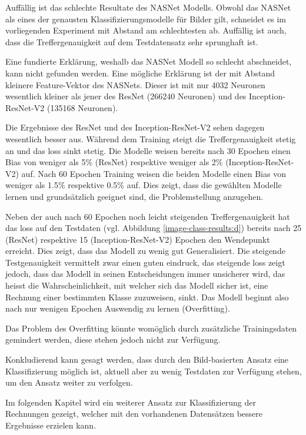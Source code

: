 Auffällig ist das schlechte Resultate des NASNet Modells. Obwohl das NASNet als eines der genausten Klassifizierungsmodelle für Bilder gilt, schneidet es im vorliegenden Experiment mit Abstand am schlechtesten ab. Auffällig ist auch, dass die Treffergenauigkeit auf dem Testdatensatz sehr sprunghaft ist.

Eine fundierte Erklärung, weshalb das NASNet Modell so schlecht abschneidet, kann nicht gefunden werden. Eine mögliche Erklärung ist der mit Abstand kleinere Feature-Vektor des NASNets. Dieser ist mit nur 4032 Neuronen wesentlich kleiner als jener des ResNet (266240 Neuronen) und des Inception-ResNet-V2 (135168 Neuronen).

Die Ergebnisse des ResNet und des Inception-ResNet-V2 sehen dagegen wesentlich besser aus. Während dem Training steigt die Treffergenauigkeit stetig an und das loss sinkt stetig. Die Modelle weisen bereits nach 30 Epochen einen Bias von weniger als 5\% (ResNet) respektive weniger als 2\% (Inception-ResNet-V2) auf. Nach 60 Epochen Training weisen die beiden Modelle einen Bias von weniger als 1.5\% respektive 0.5\% auf. Dies zeigt, dass die gewählten Modelle lernen und grundsätzlich geeignet sind, die Problemstellung anzugehen. 

Neben der auch nach 60 Epochen noch leicht steigenden Treffergenauigkeit hat das loss auf den Testdaten (vgl. Abbildung \ref{image-class-results:d}) bereits nach 25 (ResNet) respektive 15 (Inception-ResNet-V2) Epochen den Wendepunkt erreicht. Dies zeigt, dass das Modell zu wenig gut Generalisiert. Die steigende Testgenauigkeit vermittelt zwar einen guten eindruck, das steigende loss zeigt jedoch, dass das Modell in seinen Entscheidungen immer unsicherer wird, das heisst die Wahrscheinlichkeit, mit welcher sich das Modell sicher ist, eine Rechnung einer bestimmten Klasse zuzuweisen, sinkt. Das Modell beginnt also nach nur wenigen Epochen Auswendig zu lernen (Overfitting).

Das Problem des Overfitting könnte womöglich durch zusätzliche Trainingsdaten gemindert werden, diese stehen jedoch nicht zur Verfügung.

Konkludierend kann gesagt werden, dass durch den Bild-basierten Ansatz eine Klassifizierung möglich ist, aktuell aber zu wenig Testdaten zur Verfügung stehen, um den Ansatz weiter zu verfolgen.

Im folgenden Kapitel wird ein weiterer Ansatz zur Klassifizierung der Rechnungen gezeigt, welcher mit den vorhandenen Datensätzen bessere Ergebnisse erzielen kann.






